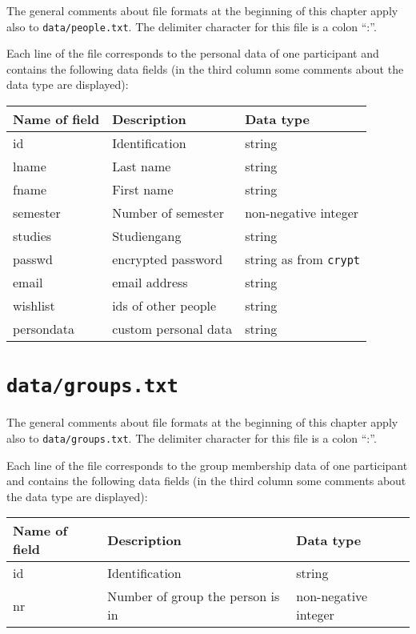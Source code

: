 \documentclass[12pt,openany,a4paper]{book}
\begin{document}
The general comments about file formats at the beginning of this chapter
apply also to \texttt{data/people.txt}. The delimiter character for this
file is a colon ``:''. 

Each line of the file corresponds to the personal data of one participant
and contains the following data fields (in the third column some
comments about the data type are displayed):

\begin{center}
\begin{tabular}{|l|l|l|}
\hline
Name of field & Description & Data type \\
\hline
\hline
id & Identification & string \\
\hline
lname & Last name   & string \\
\hline
fname & First name  & string \\
\hline
semester & Number of semester & non-negative integer \\
\hline
studies & Studiengang & string \\
\hline
passwd & encrypted password & string as from \texttt{crypt} \\
\hline
email & email address & string \\
\hline
wishlist & ids of other people & string \\
\hline
persondata & custom personal data & string \\
\hline
\end{tabular}
\end{center}

\section{\texttt{data/groups.txt}}
\label{sec:groups.txt}

The general comments about file formats at the beginning of this chapter
apply also to \texttt{data/groups.txt}. The delimiter character for this
file is a colon ``:''. 

Each line of the file corresponds to the group membership data of one
participant and contains the following data fields (in the third column
some comments about the data type are displayed):

\begin{center}
\begin{tabular}{|l|l|l|}
\hline
Name of field & Description & Data type \\
\hline
\hline
id & Identification & string \\
\hline
nr & Number of group the person is in & non-negative integer \\
\hline
\end{tabular}
\end{center}
\end{document}
